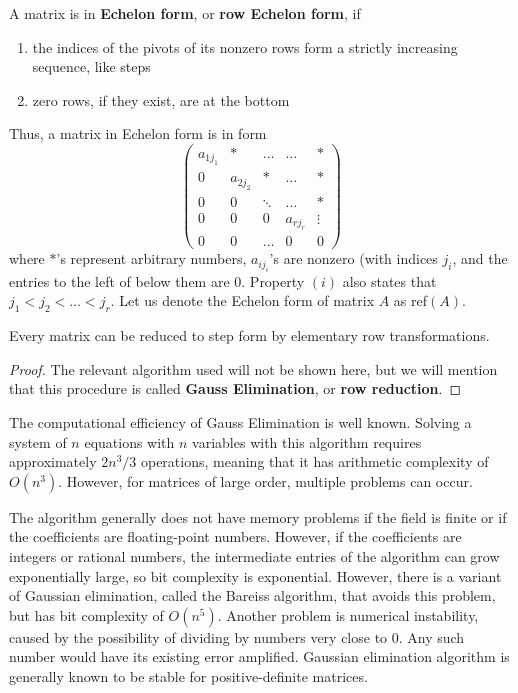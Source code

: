   \begin{definition}
    A matrix is in \textbf{Echelon form}, or \textbf{row Echelon form}, if 
    \begin{enumerate}
      \item the indices of the pivots of its nonzero rows form a strictly increasing sequence, like steps
      \item zero rows, if they exist, are at the bottom
    \end{enumerate}
    Thus, a matrix in Echelon form is in form
    \begin{equation}
      \begin{pmatrix}
        a_{1 j_1} & * & \ldots & \ldots & * \\
        0 & a_{2 j_2} & * & \ldots & * \\
        0& 0& \ddots & \ldots & * \\
        0& 0& 0& a_{r j_r} & \vdots \\
        0 & 0 & \ldots & 0 & 0
      \end{pmatrix}
    \end{equation}
    where $*$'s represent arbitrary numbers, $a_{i j_i}$'s are nonzero (with indices $j_i$, and the entries to the left of below them are $0$. Property $(i)$ also states that $j_1 < j_2 < ... < j_r$. Let us denote the Echelon form of matrix $A$ as ref$(A)$. 
  \end{definition}

  \begin{theorem}
    Every matrix can be reduced to step form by elementary row transformations. 
  \end{theorem}
  \begin{proof}
    The relevant algorithm used will not be shown here, but we will mention that this procedure is called \textbf{Gauss Elimination}, or \textbf{row reduction}. 
  \end{proof}

  The computational efficiency of Gauss Elimination is well known. Solving a system of $n$ equations with $n$ variables with this algorithm requires approximately $2 n^3 / 3$ operations, meaning that it has arithmetic complexity of $O(n^3)$. However, for matrices of large order, multiple problems can occur. 

  The algorithm generally does not have memory problems if the field is finite or if the coefficients are floating-point numbers. However, if the coefficients are integers or rational numbers, the intermediate entries of the algorithm can grow exponentially large, so bit complexity is exponential. However, there is a variant of Gaussian elimination, called the Bareiss algorithm, that avoids this problem, but has bit complexity of $O(n^5)$. Another problem is numerical instability, caused by the possibility of dividing by numbers very close to $0$. Any such number would have its existing error amplified. Gaussian elimination algorithm is generally known to be stable for positive-definite matrices. 

